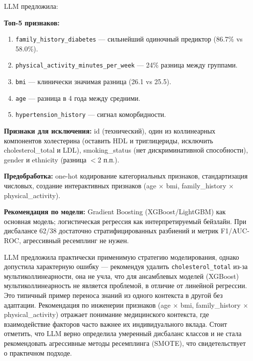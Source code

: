 \documentclass[12pt, a4paper]{article}
\begin{document}
\begin{responsebox}
LLM предложила:

\textbf{Топ-5 признаков:}
\begin{enumerate}
    \item \texttt{family\_history\_diabetes} --- сильнейший одиночный предиктор (86.7\% vs 58.0\%).
    \item \texttt{physical\_activity\_minutes\_per\_week} --- 24\% разница между группами.
    \item \texttt{bmi} --- клинически значимая разница (26.1 vs 25.5).
    \item \texttt{age} --- разница в 4 года между средними.
    \item \texttt{hypertension\_history} --- сигнал коморбидности.
\end{enumerate}

\textbf{Признаки для исключения:} id (технический), один из коллинеарных компонентов холестерина (оставить HDL и триглицериды, исключить cholesterol\_total и LDL), smoking\_status (нет дискриминативной способности), gender и ethnicity (разница $<$2 п.п.).

\textbf{Предобработка:} one-hot кодирование категориальных признаков, стандартизация числовых, создание интерактивных признаков (age $\times$ bmi, family\_history $\times$ physical\_activity).

\textbf{Рекомендация по модели:} Gradient Boosting (XGBoost/LightGBM) как основная модель; логистическая регрессия как интерпретируемый бейзлайн. При дисбалансе 62/38 достаточно стратифицированных разбиений и метрик F1/AUC-ROC, агрессивный ресемплинг не нужен.
\end{responsebox}

\begin{commentbox}
LLM предложила практически применимую стратегию моделирования, однако допустила характерную ошибку --- рекомендуя удалить \texttt{cholesterol\_total} из-за мультиколлинеарности, она не учла, что для ансамблевых моделей (XGBoost) мультиколлинеарность не является проблемой, в отличие от линейной регрессии. Это типичный пример переноса знаний из одного контекста в другой без адаптации. Рекомендация по инженерии признаков (age $\times$ bmi, family\_history $\times$ physical\_activity) отражает понимание медицинского контекста, где взаимодействие факторов часто важнее их индивидуального вклада. Стоит отметить, что LLM верно определила умеренный дисбаланс классов и не стала рекомендовать агрессивные методы ресемплинга (SMOTE), что свидетельствует о практичном подходе.
\end{commentbox}
\end{document}
